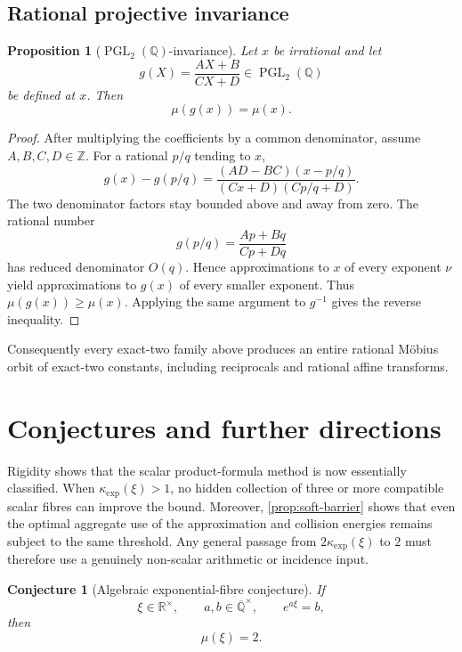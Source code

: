 \documentclass[11pt]{article}
\newcommand{\RR}{\mathbb R}
\newcommand{\QQ}{\mathbb Q}
\newcommand{\ZZ}{\mathbb Z}
\newcommand{\Qbar}{\overline{\mathbb Q}}
\DeclareMathOperator{\PGL}{PGL}
\newtheorem{proposition}[theorem]{Proposition}
\newtheorem{conjecture}[theorem]{Conjecture}
\theoremstyle{definition}
\theoremstyle{remark}
\numberwithin{equation}{section}
\begin{document}
\subsection{Rational projective invariance}

\begin{proposition}[$\PGL_2(\QQ)$-invariance]\label{prop:pgl-invariance}
Let $x$ be irrational and let
\[
 g(X)=\frac{AX+B}{CX+D}\in\PGL_2(\QQ)
\]
be defined at $x$.  Then
\[
 \boxed{\mu(g(x))=\mu(x).}
\]
\end{proposition}

\begin{proof}
After multiplying the coefficients by a common denominator, assume
$A,B,C,D\in\ZZ$.  For a rational $p/q$ tending to $x$,
\[
 g(x)-g(p/q)
 =\frac{(AD-BC)(x-p/q)}
 {(Cx+D)(Cp/q+D)}.
\]
The two denominator factors stay bounded above and away from zero.  The
rational number
\[
 g(p/q)=\frac{Ap+Bq}{Cp+Dq}
\]
has reduced denominator $O(q)$.  Hence approximations to $x$ of every
exponent $\nu$ yield approximations to $g(x)$ of every smaller exponent.
Thus $\mu(g(x))\ge\mu(x)$.  Applying the same argument to $g^{-1}$ gives
the reverse inequality.
\end{proof}

Consequently every exact-two family above produces an entire rational
Möbius orbit of exact-two constants, including reciprocals and rational
affine transforms.

\section{Conjectures and further directions}\label{sec:conjectures}

Rigidity shows that the scalar product-formula method is now essentially
classified.  When $\kappa_{\exp}(\xi)>1$, no hidden collection of three
or more compatible scalar fibres can improve the bound.  Moreover,
\cref{prop:soft-barrier} shows that even the optimal aggregate use of the
approximation and collision energies remains subject to the same
threshold.  Any general passage from $2\kappa_{\exp}(\xi)$ to $2$ must
therefore use a genuinely non-scalar arithmetic or incidence input.

\begin{conjecture}[Algebraic exponential-fibre conjecture]
\label{conj:full-fibre}
If
\[
 \xi\in\RR^\times,
 \qquad
 a,b\in\Qbar^\times,
 \qquad
 e^{a\xi}=b,
\]
then
\[
 \boxed{\mu(\xi)=2.}
\]
\end{conjecture}
\end{document}
